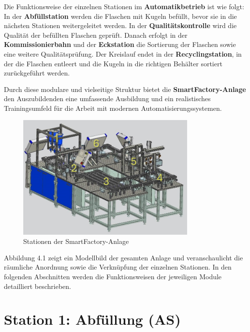 Die Funktionsweise der einzelnen Stationen im \textbf{Automatikbetrieb} ist wie folgt: In der \textbf{Abfüllstation} werden die Flaschen mit 
Kugeln befüllt, bevor sie in die nächsten Stationen weitergeleitet werden. In der \textbf{Qualitätskontrolle} wird die Qualität der befüllten 
Flaschen geprüft. Danach erfolgt in der \textbf{Kommissionierbahn} und der \textbf{Eckstation} die Sortierung der Flaschen sowie eine weitere 
Qualitätsprüfung. Der Kreislauf endet in der \textbf{Recyclingstation}, in der die Flaschen entleert und die Kugeln in die richtigen Behälter 
sortiert zurückgeführt werden.

Durch diese modulare und vielseitige Struktur bietet die \textbf{SmartFactory-Anlage} den Auszubildenden eine umfassende Ausbildung und ein 
realistisches Trainingsumfeld für die Arbeit mit modernen Automatisierungssystemen.

\begin{figure}[h!] %
    \centering  
    \includegraphics[width=0.8\textwidth]{figures/Bild.PNG}
    \caption{Stationen der SmartFactory-Anlage\cite{siemens2022}} 
    \label{fig:Stationen_SmartFactory} %
    \vspace{0.5em} %
    \small %
\end{figure}

Abbildung 4.1 zeigt ein Modellbild der gesamten Anlage und veranschaulicht die räumliche Anordnung sowie die Verknüpfung der einzelnen Stationen. 
In den folgenden Abschnitten werden die Funktionsweisen der jeweiligen Module detailliert beschrieben.

\section{Station 1: Abfüllung (AS)}\label{sec:Station 2: Abfüllung}


